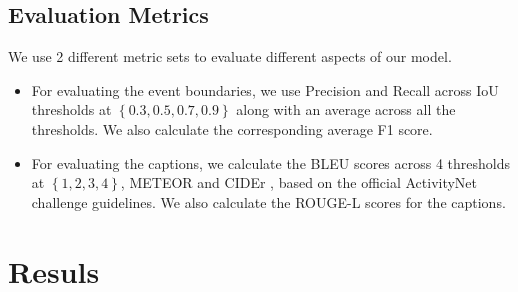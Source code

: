\subsection {Evaluation Metrics}
\par We use 2 different metric sets to evaluate different aspects of our model.
\begin{itemize}
	\item For evaluating the event boundaries, we use Precision and Recall across IoU thresholds at $\left \{0.3, 0.5, 0.7, 0.9 \right\}$ along with an average across all the thresholds. We also calculate the corresponding average F1 score.
	\item For evaluating the captions, we calculate the BLEU \cite{bleu} scores across 4 thresholds at $\left \{1, 2, 3, 4\right\}$, METEOR \cite{meteor} and CIDEr \cite{cider}, based on the official ActivityNet challenge guidelines. We also calculate the ROUGE-L \cite{rouge} scores for the captions.
\end{itemize}

\section{Resuls}

